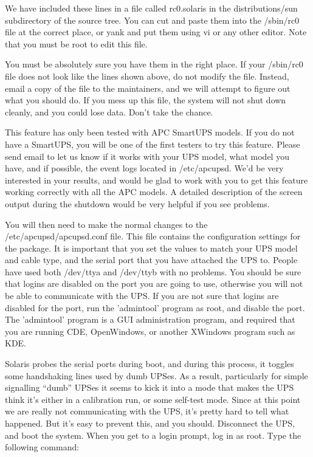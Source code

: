 We have included these lines in a file called rc0.solaris in the
distributions/sun subdirectory of the source tree. You can cut and paste them
into the /sbin/rc0 file at the correct place, or yank and put them using vi or
any other editor. Note that you must be root to edit this file.  

You must be absolutely sure you have them in the right place. If your
/sbin/rc0 file does not look like the lines shown above, do not modify the
file. Instead, email a copy of the file to the maintainers, and we will
attempt to figure out what you should do. If you mess up this file, the system
will not shut down cleanly, and you could lose data. Don't take the chance.  

This feature has only been tested with APC SmartUPS models. If you do not have
a SmartUPS, you will be one of the first testers to try this feature. Please
send email to let us know if it works with your UPS model, what model you
have, and if possible, the event logs located in /etc/apcupsd. We'd be very
interested in your results, and would be glad to work with you to get this
feature working correctly with all the APC models. A detailed description of
the screen output during the shutdown would be very helpful if you see
problems.  

You will then need to make the normal changes to the /etc/apcupsd/apcupsd.conf
file. This file contains the configuration settings for the package. It is
important that you set the values to match your UPS model and cable type, and
the serial port that you have attached the UPS to.  People have used both
/dev/ttya and /dev/ttyb with no problems. You should be sure that logins are
disabled on the port you are going to use, otherwise you will not be able to
communicate with the UPS. If you are not sure that logins are disabled for the
port, run the 'admintool' program as root, and disable the port. The
'admintool' program is a GUI administration program, and required that you are
running CDE, OpenWindows, or another XWindows program such as KDE.  

Solaris probes the serial ports during boot, and during this process, it
toggles some handshaking lines used by dumb UPSes. As a result, particularly
for simple signalling ``dumb'' UPSes it seems to kick it into a mode that
makes the UPS think it's either in a calibration run, or some self-test mode.
Since at this point we are really not communicating with the UPS, it's pretty
hard to tell what happened. But it's easy to prevent this, and you should.
Disconnect the UPS, and boot the system. When you get to a login prompt, log
in as root. Type the following command: 

